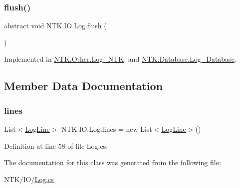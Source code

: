 \mbox{\label{class_n_t_k_1_1_i_o_1_1_log_ac59e6a398332c79ad801e79f20ffed10}} 
\subsubsection{\texorpdfstring{flush()}{flush()}}
{\footnotesize\ttfamily abstract void N\+T\+K.\+I\+O.\+Log.\+flush (\begin{DoxyParamCaption}{ }\end{DoxyParamCaption})\hspace{0.3cm}{\ttfamily [pure virtual]}}



Implemented in \mbox{\hyperlink{class_n_t_k_1_1_other_1_1_log___n_t_k_acd0d0f0a9ceefbb23da69394d7153632}{N\+T\+K.\+Other.\+Log\+\_\+\+N\+TK}}, and \mbox{\hyperlink{class_n_t_k_1_1_database_1_1_log___database_a4783f62069c0032c8ee979352853c1bb}{N\+T\+K.\+Database.\+Log\+\_\+\+Database}}.



\subsection{Member Data Documentation}
\mbox{\label{class_n_t_k_1_1_i_o_1_1_log_abf91900cf3b8201288ab460793239844}} 
\subsubsection{\texorpdfstring{lines}{lines}}
{\footnotesize\ttfamily List$<$\mbox{\hyperlink{class_n_t_k_1_1_i_o_1_1_log_line}{Log\+Line}}$>$ N\+T\+K.\+I\+O.\+Log.\+lines = new List$<$\mbox{\hyperlink{class_n_t_k_1_1_i_o_1_1_log_line}{Log\+Line}}$>$()\hspace{0.3cm}{\ttfamily [protected]}}







Definition at line 58 of file Log.\+cs.



The documentation for this class was generated from the following file\+:\begin{DoxyCompactItemize}
\item 
N\+T\+K/\+I\+O/\mbox{\hyperlink{_log_8cs}{Log.\+cs}}\end{DoxyCompactItemize}
